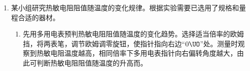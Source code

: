 \documentclass[\gkver]{gaokaozhenti}
\begin{document}
\begin{enumerate}
\begin{enumerate}
	\item
	利用 $\Delta L_{i}=L_{i+3}-L_{i}$（$i=1$，$2$，$3$）计算弹簧的压缩量：$\Delta L_{1}=6.03\Ucm$，$\Delta L_{2}=6.08\Ucm$，$\Delta L_{3}=$$\Ucm$，压缩量的平均值 $\overline{\Delta L}=\frac{\Delta L_{1}+\Delta L_{2}+\Delta L_{3}}{3}=$$\Ucm$；

	\item
	上述 $\overline{\Delta L}$ 是管中增加个钢球时产生的弹簧平均压缩量；

	\item
	忽略摩擦，重力加速度 $g$ 取 $9.80\Umsq$，该弹簧的劲度系数为$\UNm$。（结果保留 3 位有效数字）
\end{enumerate}



\item
某小组研究热敏电阻阻值随温度的变化规律。根据实验需要已选用了规格和量程合适的器材。

\begin{enumerate}
	\item
	先用多用电表预判热敏电阻阻值随温度的变化趋势。选择适当倍率的欧姆挡，将两表笔，调节欧姆调零旋钮，使指针指向右边“$0\UO$”处。测量时观察到热敏电阻温度越高，相同倍率下多用电表指针向右偏转角度越大，由此可判断热敏电阻阻值随温度的升高而。


\end{enumerate}
\end{enumerate}
\end{document}
